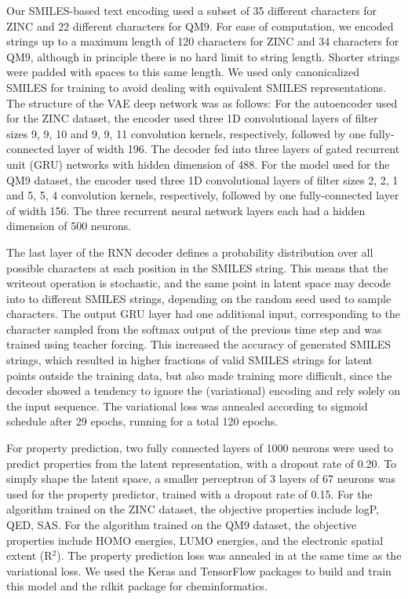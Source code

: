 Our SMILES-based text encoding used a subset of 35 different characters for ZINC and 22 different characters for QM9.
For ease of computation, we encoded strings up to a maximum length of 120 characters for ZINC and 34 characters for QM9, although in principle there is no hard limit to string length. Shorter strings were padded with spaces to this same length. We used only canonicalized SMILES for training to avoid dealing with equivalent SMILES representations.
The structure of the VAE deep network was as follows: For the autoencoder used for the ZINC dataset, the encoder used three 1D convolutional layers of filter sizes 9, 9, 10 and 9, 9, 11 convolution kernels, respectively, followed by one fully-connected layer of width 196. The decoder fed into three layers of gated recurrent unit (GRU) networks\cite{chung_2014_empirical} with hidden dimension of 488. %
For the model used for the QM9 dataset, the encoder used three 1D convolutional layers of filter sizes 2, 2, 1 and 5, 5, 4 convolution kernels, respectively, followed by one fully-connected layer of width 156. The three recurrent neural network layers each had a hidden dimension of 500 neurons.

The last layer of the RNN decoder defines a probability distribution over all possible characters at each position in the SMILES string.
This means that the writeout operation is stochastic, and the same point in latent space may decode into to different SMILES strings, depending on the random seed used to sample characters.
The output GRU layer had one additional input, corresponding to the character sampled from the softmax output of the previous time step and was trained using teacher forcing.\cite{williams_1989} This increased the accuracy of generated SMILES strings, which resulted in higher fractions of valid SMILES strings for latent points outside the training data, but also made training more difficult, since the decoder showed a tendency to ignore the (variational) encoding and rely solely on the input sequence. The variational loss was annealed according to sigmoid schedule after 29 epochs, running for a total 120 epochs.

For property prediction, two fully connected layers of 1000 neurons were used to predict properties from the latent representation, with a dropout rate of 0.20. To simply shape the latent space, a smaller perceptron of 3 layers of 67 neurons was used for the property predictor, trained with a dropout rate of 0.15. For the algorithm trained on the ZINC dataset, the objective properties include logP, QED, SAS. For the algorithm trained on the QM9 dataset, the objective properties include HOMO energies, LUMO energies, and the electronic spatial extent (R$^2$). The property prediction loss was annealed in at the same time as the variational loss.
We used the Keras\cite{chollet_2015} and TensorFlow\cite{Tensorflow-2016} packages to build and train this model and the rdkit package for cheminformatics\cite{rdkit}.



